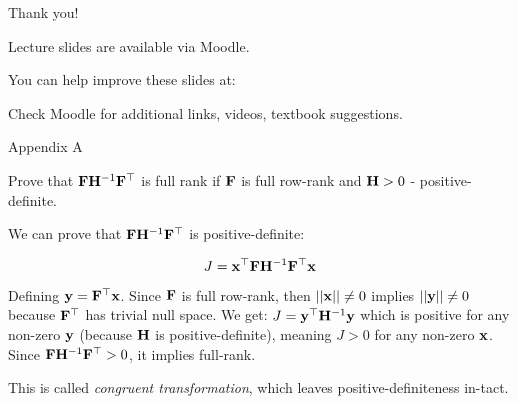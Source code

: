 \documentclass{beamer}
\begin{document}
\begin{frame}{Thank you!}
\centerline{Lecture slides are available via Moodle.}
\bigskip
\centerline{You can help improve these slides at:}
\centerline{\mygit}
\bigskip
\centerline{Check Moodle for additional links, videos, textbook suggestions.}
\bigskip

\centerline{\textcolor{black}{}}

\end{frame}



\begin{frame}{Appendix A}
	\begin{flushleft}
		
		Prove that $\mathbf{F}\mathbf{H}^{-1}\mathbf{F}^\top$ is full rank if $\mathbf{F}$ is full row-rank and $\mathbf{H} > 0$ - positive-definite.
		
		\bigskip
		
		We can prove that $\mathbf{F}\mathbf{H}^{-1}\mathbf{F}^\top$ is positive-definite:
		
		\begin{equation}
			J = \mathbf{x}^\top\mathbf{F}\mathbf{H}^{-1}\mathbf{F}^\top\mathbf{x}
		\end{equation}
		
		Defining $\mathbf{y} = \mathbf{F}^\top\mathbf{x}$. Since $\mathbf{F}$ is full row-rank, then $|| \mathbf{x} || \neq 0$ implies $|| \mathbf{y} || \neq 0$ because $\mathbf{F}^\top$ has trivial null space. We get: $J = \mathbf{y}^\top\mathbf{H}^{-1}\mathbf{y}$ which is positive for any non-zero $\mathbf{y}$ (because $\mathbf{H}$ is positive-definite), meaning $J  > 0$ for any non-zero $\mathbf{x}$. Since $\mathbf{F}\mathbf{H}^{-1}\mathbf{F}^\top > 0$, it implies full-rank.
		
		\bigskip
		
		This is called \emph{congruent transformation}, which leaves positive-definiteness in-tact. 
		
	\end{flushleft}
\end{frame}
\end{document}

